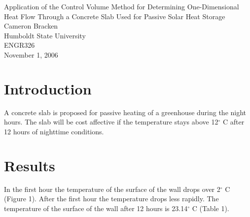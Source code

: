 \documentclass[titlepage,11pt]{article}
\begin{document}
\onehalfspacing

\begin{singlespacing}
\begin{center}
\Large{Application of the Control Volume Method for Determining
One-Dimensional Heat Flow Through a Concrete Slab Used for Passive
Solar Heat Storage\\}
\vspace{.6cm} %
\large{Cameron Bracken\\Humboldt State University\\ENGR326}
\vspace{.6cm} \\
\large{November 1, 2006}
\end{center}
\vspace{2cm}
\end{singlespacing}

\section{Introduction}\pagestyle{empty}
A concrete slab is proposed for passive heating of a greenhouse
during the night hours.  The slab will be cost affective if the
temperature stays above 12$^\circ$ C after 12 hours of nighttime
conditions.
\section{Results}
\pagestyle{headings} In the first hour the
temperature of the surface of the wall drops over 2$^\circ$ C
(Figure 1). After the first hour the temperature drops less rapidly.
The temperature of the surface of the wall after 12 hours is
23.14$^\circ$ C (Table 1).
\end{document}
